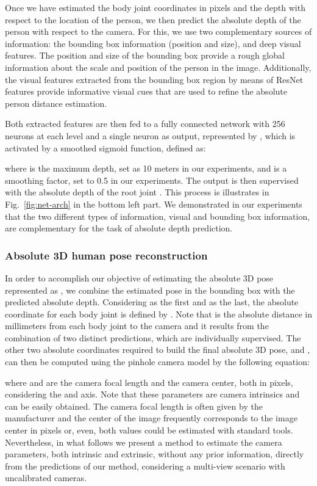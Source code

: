 \documentclass[10pt,twocolumn,letterpaper]{article}
\newcommand{\rev}[1]{#1}
\newcommand{\revb}[1]{{#1}}
\begin{document}
Once we have estimated the body joint coordinates in pixels and the depth with
respect to the location of the person, we then predict the absolute depth of
the person with respect to the camera. For this, we use two
\rev{complementary} sources of 
information: the bounding box information (position and size), and deep visual features.
The position and size of the bounding box provide a rough global information
about the scale and position of the person in the image.
Additionally, the visual features extracted from the bounding box region by
means of ResNet features provide informative visual cues that are used to
refine the absolute person distance estimation.

Both extracted features are then fed to a fully connected network with 256
neurons at each level and a single neuron as output,
represented by , which is activated by a smoothed sigmoid
function, defined as:

where  is the maximum depth, set as 10 meters in our experiments, \revb{and  is a smoothing factor, set to 0.5 in our experiments}. The
output  is then supervised with the absolute depth
of the root joint .
This process is illustrates in Fig.~\ref{fig:net-arch} in the bottom left part.
We demonstrated in our experiments that the two different types of information,
visual and bounding box information, are complementary for the task of
absolute depth prediction.

\subsubsection{Absolute 3D human pose reconstruction}

In order to accomplish our objective of estimating the absolute 3D pose
represented as , we
combine the estimated pose in the bounding box with the predicted absolute
depth. Considering  as the first and 
as the last, the absolute  coordinate for each body joint is defined
by .
Note that  is the absolute distance in millimeters from each body joint
to the camera and it results from the combination of two distinct predictions,
which are individually supervised.
The other two absolute coordinates required to build the final absolute 3D
pose,  and , can then be computed using the pinhole camera model by the following equation:

where  and  are the camera focal length and the camera center, both in
pixels, considering the  and  axis.
Note that these parameters are camera intrinsics and can be easily obtained.
The camera focal length is often given by the manufacturer and the center
of the image frequently corresponds to the image center in pixels or, even,
both values could be estimated with standard tools.
Nevertheless, \revb{in what follows we present} a method to estimate the
camera parameters, both intrinsic and extrinsic, without any prior information, directly
from the predictions of our method, considering a multi-view scenario
with uncalibrated cameras.
\end{document}

